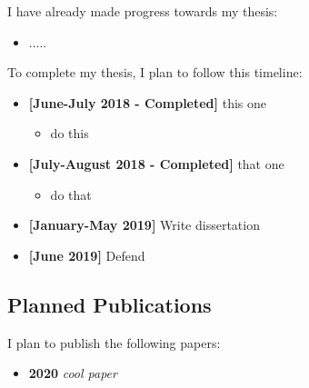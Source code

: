I have already made progress towards my thesis:

\begin{itemize}
  \item .....
\end{itemize}

To complete my thesis, I plan to follow this timeline:

\begin{itemize}
  \item \textbf{[June-July 2018 - Completed]} this one
    \begin{itemize}
    \item do this
    \end{itemize}
  \item \textbf{[July-August 2018 - Completed]} that one
    \begin{itemize}
      \item do that
    \end{itemize}
  \item \textbf{[January-May 2019]} Write dissertation
  \item \textbf{[June 2019]} Defend
\end{itemize}

\subsection{Planned Publications}

I plan to publish the following papers:

\begin{itemize}
  \item \textbf{2020} \emph{cool paper}
\end{itemize}
